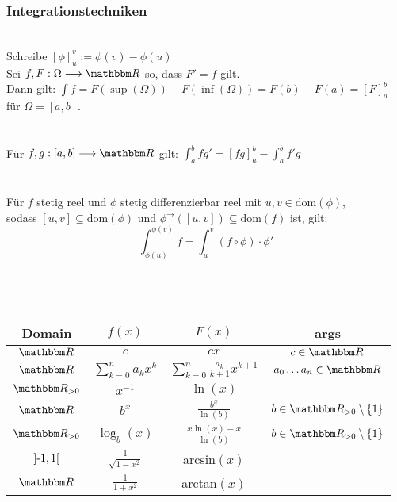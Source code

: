 \subsubsection*{Integrationstechniken}
 \\
Schreibe \([\phi]_u^v := \phi(v) - \phi(u)\) \\
Sei \(f,F: \Omega \longrightarrow \R\) so, dass \(F' = f\) gilt. \\
Dann gilt: \(\int f = F(\sup(\Omega)) - F(\inf(\Omega)) = F(b) - F(a) = [F]_a^b\) für \(\Omega = [a,b]\). \\ \\
 \\
Für \(f,g : [a,b] \longrightarrow \R\) gilt: \(\int_{a}^{b}fg' = [fg]_a^b - \int_{a}^{b}f'g\) \\ \\
 \\
Für \(f\) stetig reel und \(\phi\) stetig differenzierbar reel mit \(u,v \in \text{dom}(\phi)\),\\
sodass \([u,v] \subseteq \text{dom}(\phi)\) und \(\phi^\rightarrow([u,v]) \subseteq \text{dom}(f)\) ist, gilt:
\[\int_{\phi(u)}^{\phi(v)}f = \int_{u}^{v}(f \circ \phi) \cdot \phi'\] \pagebreak \\
 \\ \\
\begin{tabular}{ c | c | c | c }
    \hline
    Domain & \(f(x)\) & \(F(x)\) & args \\
    \hline
    \(\R\) & \(c\) & \(cx\) & \(c \in \R\) \\
    \(\R\) & \(\sum_{k=0}^{n}a_kx^k\) & \(\sum_{k=0}^{n}\frac{a_k}{k+1}x^{k+1}\) & \(a_0 \dots a_n \in \R\) \\
    \(\R_{> 0}\) & \(x^{-1}\) & \(\ln(x)\) & \\
    \(\R\) & \(b^x\) & \(\frac{b^x}{\ln(b)}\) & \(b \in \R_{>0} \setminus \{1\}\) \\
    \(\R_{> 0}\) & \(\log_b(x)\) & \(\frac{x\ln(x) - x}{\ln(b)}\) & \(b \in \R_{>0} \setminus \{1\}\) \\
    \(]\text{-} 1, 1[\) & \(\frac{1}{\sqrt{1-x^2}}\) & arcsin\((x)\) & \\
    \(\R\) & \(\frac{1}{1+x^2}\) & arctan\((x)\) & \\
\end{tabular}
